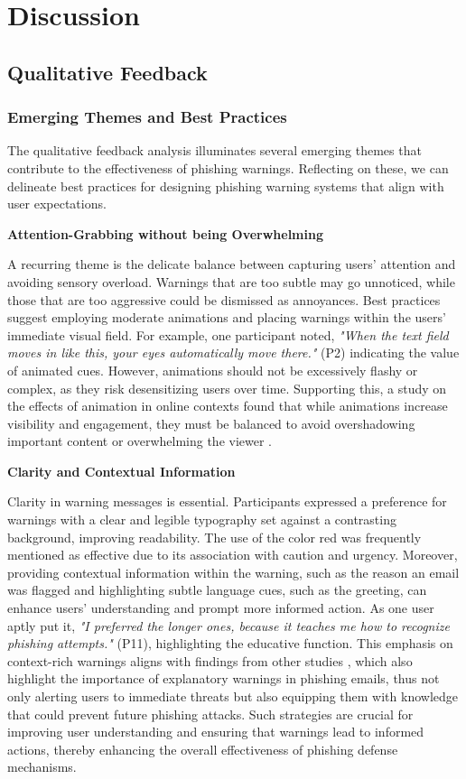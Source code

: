 \documentclass[
  a4paper,  %
  twoside,  %
  bibliography=totoc,
  headsepline,
  cleardoublepage=empty,
  parskip=half,
  draft=false
]{scrbook}
\begin{document}
\chapter{Discussion}
\section{Qualitative Feedback}
\subsection{Emerging Themes and Best Practices}
The qualitative feedback analysis illuminates several emerging themes that contribute to the effectiveness of phishing warnings. Reflecting on these, we can delineate best practices for designing phishing warning systems that align with user expectations.

\textbf{Attention-Grabbing without being Overwhelming}

A recurring theme is the delicate balance between capturing users’ attention and avoiding sensory overload. Warnings that are too subtle may go unnoticed, while those that are too aggressive could be dismissed as annoyances. Best practices suggest employing moderate animations and placing warnings within the users' immediate visual field. For example, one participant noted, \textit{"When the text field moves in like this, your eyes automatically move there."} (P2) indicating the value of animated cues. However, animations should not be excessively flashy or complex, as they risk desensitizing users over time. Supporting this, a study on the effects of animation in online contexts found that while animations increase visibility and engagement, they must be balanced to avoid overshadowing important content or overwhelming the viewer \cite{cheung}.

\textbf{Clarity and Contextual Information}

Clarity in warning messages is essential. Participants expressed a preference for warnings with a clear and legible typography set against a contrasting background, improving readability. The use of the color red was frequently mentioned as effective due to its association with caution and urgency. \newline 
Moreover, providing contextual information within the warning, such as the reason an email was flagged and highlighting subtle language cues, such as the greeting, can enhance users’ understanding and prompt more informed action. As one user aptly put it, \textit{"I preferred the longer ones, because it teaches me how to recognize phishing attempts."} (P11), highlighting the educative function. \newline
This emphasis on context-rich warnings aligns with findings from other studies \cite{buono, aneke}, which also highlight the importance of explanatory warnings in phishing emails, thus not only alerting users to immediate threats but also equipping them with knowledge that could prevent future phishing attacks. Such strategies are crucial for improving user understanding and ensuring that warnings lead to informed actions, thereby enhancing the overall effectiveness of phishing defense mechanisms.
\end{document}
